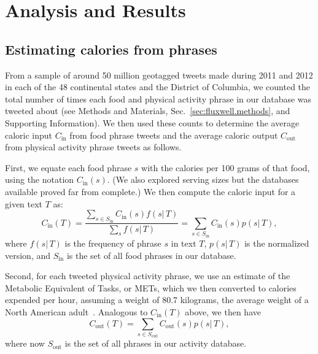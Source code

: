 \documentclass[10pt]{article}
\newcommand{\calin}{C_{\textrm{in}}}
\newcommand{\calout}{C_{\textrm{out}}}
\newcommand{\calinfn}[1]{C_{\textrm{in}}(#1)}
\newcommand{\caloutfn}[1]{C_{\textrm{out}}(#1)}
\newcommand{\frequency}[2]{f(#1|\,#2)}
\newcommand{\normfrequency}[2]{p(#1|\,#2)}
\newcommand{\phrasesymbol}{s}
\newcommand{\phrasesetsymbol}{S}
\newcommand{\foodphrase}{\phrasesymbol}
\newcommand{\foodphraseset}{\phrasesetsymbol_{\textrm{in}}}
\newcommand{\activityphrase}{\phrasesymbol}
\newcommand{\activityphraseset}{\phrasesetsymbol_{\textrm{out}}}
\begin{document}
\section*{Analysis and Results}
\label{sec:fluxwell.results}

\subsection*{Estimating calories from phrases}
\label{subsec:fluxwell.calories}

From a sample of around 50 million geotagged tweets 
made during 2011 and 2012 in each of the 48
continental states and the District of Columbia, 
we counted the total number of times each food and physical activity
phrase in our database was tweeted about (see Methods and Materials,
Sec.~\ref{sec:fluxwell.methods}, and Supporting Information).  
We then used these counts to determine the average caloric input $\calin$
from food phrase tweets
and the average caloric output $\calout$
from physical activity phrase tweets as follows.

First, we equate each food phrase $\foodphrase$
with the calories per 100 grams of that food,
using the notation
$\calinfn{\foodphrase}$.
(We also explored serving sizes but the databases 
available proved far from complete.)
We then compute the caloric input
for a given text $T$ as:
\begin{equation}
  \calinfn{T}
  = 
  \frac{
    \sum_{\foodphrase \in \foodphraseset}
    \calinfn{\foodphrase}
    \frequency{\foodphrase}{T}
  }
  {
    \sum_{\foodphrase}
    \frequency{\foodphrase}{T}
  }
  = 
    \sum_{\foodphrase \in \foodphraseset}
    \calinfn{\foodphrase}
    \normfrequency{\foodphrase}{T},
  \label{eq:fluxwell.calin}
\end{equation}
where $\frequency{\foodphrase}{T}$ 
is the frequency of phrase $\foodphrase$ 
in text $T$,
$\normfrequency{\foodphrase}{T}$
is the normalized version,
and 
$\foodphraseset$
is the set of all food phrases in our database.

Second, for each tweeted physical activity phrase, 
we use an estimate of the Metabolic Equivalent of Tasks, or METs,
which we then converted to calories expended per hour,
assuming a weight of 80.7 kilograms, the average weight of a North American
adult~\cite{walpole2012}.
Analogous to $\calinfn{T}$ above, 
we then have
\begin{equation}
  \caloutfn{T}
  = 
  \sum_{\activityphrase \in \activityphraseset}
  \caloutfn{\activityphrase}
  \normfrequency{\activityphrase}{T},
  \label{eq:fluxwell.calout}
\end{equation}
where now 
$\activityphraseset$
is the set of all phrases in our activity database.
\end{document}

